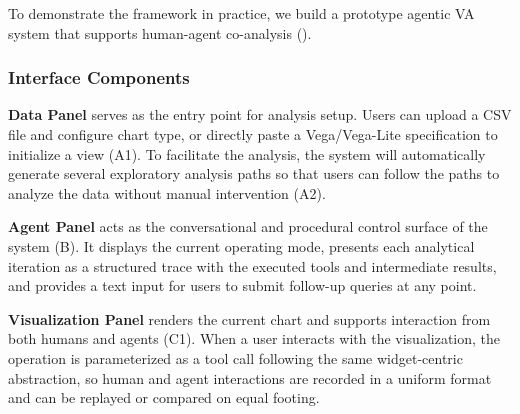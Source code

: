 

To demonstrate the framework in practice, we build a prototype agentic VA system that supports human-agent co-analysis ().

\subsubsection{Interface Components}

\textbf{Data Panel} serves as the entry point for analysis setup.
Users can upload a CSV file and configure chart type, or directly paste a Vega/Vega-Lite specification to initialize   a view (A1).
To facilitate the analysis, the system will automatically generate several exploratory analysis paths so that users can follow the paths to analyze the data without manual intervention (A2).

\noindent\textbf{Agent Panel} acts as the conversational and procedural control surface of the system (B).
It displays the current operating mode, presents each analytical iteration as a structured trace with the executed tools and intermediate results, and provides a text input for users to submit follow-up queries at any point.

\noindent\textbf{Visualization Panel} renders the current chart and supports interaction from both humans and agents (C1).
When a user interacts with the visualization, the operation is parameterized as a tool call following the same widget-centric abstraction, so human and agent interactions are recorded in a uniform format and can be replayed or compared on equal footing.

